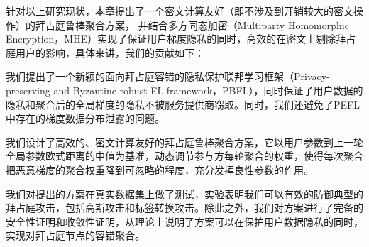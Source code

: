 针对以上研究现状，本章提出了一个密文计算友好（即不涉及到开销较大的密文操作）的拜占庭鲁棒聚合方案，
并结合多方同态加密（Multiparty Homomorphic Encryption，MHE）实现了保证用户梯度隐私的同时，高效的在密文上剔除拜占庭用户的影响，具体来讲，我们的贡献如下：
\begin{compactenum}
	\item  我们提出了一个新颖的面向拜占庭容错的隐私保护联邦学习框架（Privacy-preserving and Byzantine-robust FL framework，PBFL），同时保证了用户数据的隐私和聚合后的全局梯度的隐私不被服务提供商窃取。同时，我们还避免了PEFL\cite{liu2021privacy}中存在的梯度数据分布泄露的问题。
	\item 我们设计了高效的、密文计算友好的拜占庭鲁棒聚合方案，它以用户参数到上一轮全局参数欧式距离的中值为基准，动态调节参与方每轮聚合的权重，使得每次聚合把恶意梯度的聚合权重降到可忽略的程度，充分发挥良性参数的作用。
	\item 我们对提出的方案在真实数据集上做了测试，实验表明我们可以有效的防御典型的拜占庭攻击，包括高斯攻击和标签转换攻击。除此之外，我们对方案进行了完备的安全性证明和收敛性证明，从理论上说明了方案可以在保护用户数据隐私的同时，实现对拜占庭节点的容错聚合。
\end{compactenum}

\begin{table}
	\centering
	\caption{Comparison with prior works on properties necessary for FL}
	\label{cmp}
\end{table}

